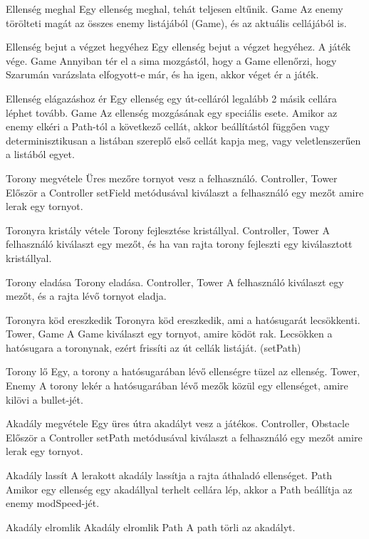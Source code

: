\usecase
{Ellenség meghal}
{Egy ellenség meghal, tehát teljesen eltűnik.}
{Game}
{Az enemy törölteti magát az összes enemy listájából (Game), és az aktuális cellájából is.}

\usecase
{Ellenség bejut a végzet hegyéhez}
{Egy ellenség bejut a végzet hegyéhez. A játék vége.}
{Game}
{Annyiban tér el a sima mozgástól, hogy a Game ellenőrzi, hogy Szarumán varázslata elfogyott-e már, és ha igen, akkor véget ér a játék.}

\usecase
{Ellenség elágazáshoz ér}
{Egy ellenség egy út-celláról legalább 2 másik cellára léphet tovább.}
{Game}
{Az ellenség mozgásának egy speciális esete. Amikor az enemy elkéri a Path-tól a következő cellát, akkor beállítástól függően vagy determinisztikusan a listában szereplő első cellát kapja meg, vagy veletlenszerűen a listából egyet.}

\usecase
{Torony megvétele}
{Üres mezőre tornyot vesz a felhasználó.}
{Controller, Tower}
{Először a Controller setField metódusával kiválaszt a felhasználó egy mezőt amire lerak egy tornyot.}

\usecase
{Toronyra kristály vétele}
{Torony fejlesztése kristállyal.}
{Controller, Tower}
{A felhasználó kiválaszt egy mezőt, és ha van rajta torony fejleszti egy kiválasztott kristállyal.}

\usecase
{Torony eladása}
{Torony eladása.}
{Controller, Tower}
{A felhasználó kiválaszt egy mezőt, és a rajta lévő tornyot eladja.}

\usecase
{Toronyra köd ereszkedik}
{Toronyra köd ereszkedik, ami a hatósugarát lecsökkenti.}
{Tower, Game}
{A Game kiválaszt egy tornyot, amire ködöt rak. Lecsökken a hatósugara a toronynak, ezért frissíti az út cellák listáját. (setPath)}

\usecase
{Torony lő}
{Egy, a torony a hatósugarában lévő ellenségre tüzel az ellenség.}
{Tower, Enemy}
{A torony lekér a hatósugarában lévő mezők közül egy ellenséget, amire kilövi a bullet-jét.}

\usecase
{Akadály megvétele}
{Egy üres útra akadályt vesz a játékos.}
{Controller, Obstacle}
{Először a Controller setPath metódusával kiválaszt a felhasználó egy mezőt amire lerak egy tornyot.}

\usecase
{Akadály lassít}
{A lerakott akadály lassítja a rajta áthaladó ellenséget.}
{Path}
{Amikor egy ellenség egy akadállyal terhelt cellára lép, akkor a Path beállítja az enemy modSpeed-jét.}

\usecase
{Akadály elromlik}
{Akadály elromlik}
{Path}
{A path törli az akadályt.}

